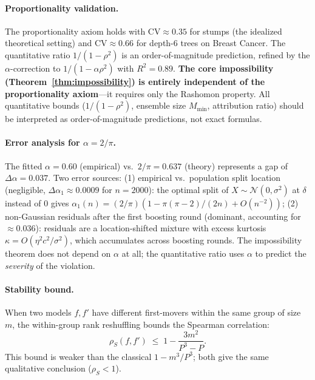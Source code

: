 \documentclass{article}
\begin{document}
\paragraph{Proportionality validation.}
The proportionality axiom holds with CV${\approx}0.35$ for stumps (the idealized theoretical setting) and CV${\approx}0.66$ for depth-6 trees on Breast Cancer. The quantitative ratio $1/(1{-}\rho^2)$ is an order-of-magnitude prediction, refined by the $\alpha$-correction to $1/(1{-}\alpha\rho^2)$ with $R^2 = 0.89$. \textbf{The core impossibility (Theorem~\ref{thm:impossibility}) is entirely independent of the proportionality axiom}---it requires only the Rashomon property. All quantitative bounds ($1/(1{-}\rho^2)$, ensemble size $M_{\min}$, attribution ratio) should be interpreted as order-of-magnitude predictions, not exact formulas.

\paragraph{Error analysis for $\alpha = 2/\pi$.}
The fitted $\alpha = 0.60$ (empirical) vs.\ $2/\pi = 0.637$ (theory) represents a gap of $\Delta\alpha = 0.037$. Two error sources: (1) empirical vs.\ population split location (negligible, $\Delta\alpha_1 \approx 0.0009$ for $n = 2000$): the optimal split of $X \sim \mathcal{N}(0, \sigma^2)$ at $\delta$ instead of $0$ gives $\alpha_1(n) = (2/\pi)(1 - \pi(\pi-2)/(2n) + O(n^{-2}))$; (2) non-Gaussian residuals after the first boosting round (dominant, accounting for $\approx 0.036$): residuals are a location-shifted mixture with excess kurtosis $\kappa = O(\eta^2 c^2/\sigma^2)$, which accumulates across boosting rounds. The impossibility theorem does not depend on $\alpha$ at all; the quantitative ratio uses $\alpha$ to predict the \emph{severity} of the violation.

\paragraph{Stability bound.}
When two models $f, f'$ have different first-movers within the same group of size $m$, the within-group rank reshuffling bounds the Spearman correlation:
\[
    \rho_S(f, f') \;\leq\; 1 - \frac{3m^2}{P^3 - P}.
\]
This bound is weaker than the classical $1 - m^3/P^3$; both give the same qualitative conclusion ($\rho_S < 1$).
\end{document}
